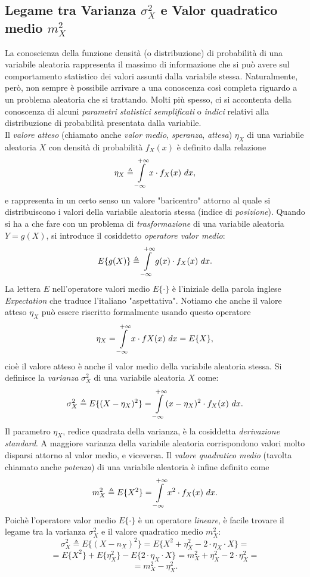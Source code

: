 \documentclass[12pt,oneside,openany]{memoir}
\numberwithin{equation}{subsection}
\begin{document}
\subsection{Legame tra Varianza $\sigma_X^2$ e Valor quadratico medio $m_X^2$}
La conoscienza della funzione densit\`a (o distribuzione) di probabilit\`a di
una variabile aleatoria rappresenta il massimo di informazione che si pu\`o
avere sul comportamento statistico dei valori assunti dalla variabile stessa.
Naturalmente, per\`o, non sempre \`e possibile arrivare a una conoscenza cos\`i
completa riguardo a un problema aleatoria che si trattando. Molti pi\`u spesso,
ci si accontenta della conoscenza di alcuni \textit{parametri statistici
semplificati} o \textit{indici} relativi alla distribuzione di probabilit\`a
presentata dalla variabile.\\
Il \textit{valore atteso} (chiamato anche \textit{valor medio},
\textit{speranza}, \textit{attesa}) $\eta_X$ di una variabile aleatoria $X$
con densit\`a di probabilit\`a $f_X(x)$ \`e definito dalla relazione
\[
    \eta_X \triangleq \int\displaylimits_{-\infty}^{+\infty} x \cdot f_X(x)
    \ dx,
\]
e rappresenta in un certo senso un valore "baricentro" attorno al quale si
distribuiscono i valori della variabile aleatoria stessa (indice di
\textit{posizione}).
\bigbreak
Quando si ha a che fare con un problema di \textit{trasformazione} di una
variabile aleatoria $Y = g(X)$, si introduce il cosiddetto \textit{operatore
valor medio}:
\[
    E\{g(X)\} \triangleq \int\displaylimits_{-\infty}^{+\infty} g(x) \cdot
    f_X(x) \ dx.
\]
La lettera $E$ nell'operatore valori medio $E\{\cdot\}$ \`e l'iniziale della
parola inglese \textit{Expectation} che traduce l'italiano "aspettativa".
Notiamo che anche il valore atteso $\eta_X$ pu\`o essere riscritto formalmente
usando questo operatore
\[
    \eta_X = \int\displaylimits_{-\infty}^{+\infty} x \cdot fX(x) \ dx = E\{X\},
\]
cio\`e il valore atteso \`e anche il valor medio della variabile aleatoria
stessa.
\bigbreak
Si definisce la \textit{varianza} $\sigma_X^2$ di una variabile aleatoria $X$
come:
\[
    \sigma_X^2 \triangleq E\{(X - \eta_X)^2\} =
    \int\displaylimits_{-\infty}^{+\infty} (x - \eta_X)^2 \cdot f_X(x) \ dx.
\]
Il parametro $\eta_X$, redice quadrata della varianza, \`e la cosiddetta
\textit{derivazione standard}. A maggiore varianza della variabile aleatoria
corrispondono valori molto disparsi attorno al valor medio, e viceversa.
\bigbreak
Il \textit{valore quadratico medio} (tavolta chiamato anche \textit{potenza}) di
una variabile aleatoria \`e infine definito come
\[
    m_X^2 \triangleq E\{X^2\} = \int\displaylimits_{-\infty}^{+\infty} x^2 \cdot
    f_X(x) \ dx.
\]
Poich\`e l'operatore valor medio $E\{\cdot\}$ \`e un operatore \textit{lineare},
\`e facile trovare il legame tra la varianza $\sigma_X^2$ e il valore quadratico
medio $m_X^2$:
\[
    \sigma_X^2 \triangleq E\{(X - n_X)^2\} = E\{X^2 + \eta_X^2 - 2 \cdot
    \eta_X \cdot X\} =
\]
\[
    = E\{X^2\} + E\{\eta_X^2\} - E\{2 \cdot \eta_X \cdot X\} = m_X^2 + \eta_X^2
    - 2 \cdot \eta_X^2 =
\]
\[
    = m_X^2 - \eta_X^2.
\]
\end{document}
